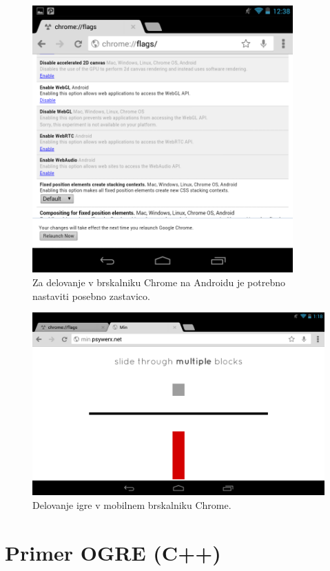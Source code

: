 \begin{figure}
\begin{center}
\includegraphics[width=10cm]{pic/min-chrome-flag.png}
\end{center}
\caption{Za delovanje v brskalniku Chrome na Androidu je potrebno nastaviti posebno zastavico.}
\label{minchromeflag}
\end{figure} 

\begin{figure}
\begin{center}
\includegraphics[width=12cm]{pic/min-chrome.png}
\end{center}
\caption{Delovanje igre v mobilnem brskalniku Chrome.}
\label{minchrome}
\end{figure}

\section{Primer OGRE (C++)}




